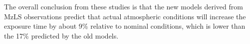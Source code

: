 \documentclass[12pt]{article}
\begin{document}
The overall conclusion from these studies is that the new models derived from MzLS observations predict that actual atmospheric conditions will increase the exposure time by about 9\% relative to nominal conditions, which is lower than the 17\% predicted by the old models.

\def\pasp{PASP} %



\end{document}
